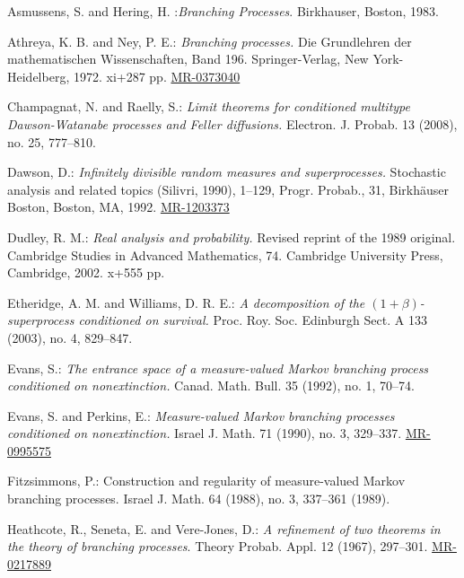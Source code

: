 \documentclass[12pt,a4paper]{amsart}
\numberwithin{equation}{section}
\theoremstyle{plain}
\theoremstyle{definition}
\theoremstyle{remark}
\def\MR#1{\href{http://www.ams.org/mathscinet-getitem?mr=#1}{MR-#1}}
\begin{document}
\begin{thebibliography}{99}

	Asmussens, S. and Hering, H. :\emph{Branching Processes}. Birkhauser, Boston, 1983.

	Athreya, K. B. and Ney, P. E.:
	\emph{Branching processes.}
	Die Grundlehren der mathematischen Wissenschaften, Band 196. Springer-Verlag, New York-Heidelberg, 1972. xi+287 pp.
	\MR{0373040}
	
Champagnat, N. and Raelly, S.:
	\emph{Limit theorems for conditioned multitype Dawson-Watanabe processes and Feller diffusions.}
	Electron. J. Probab. 13 (2008), no. 25,
	777--810.

	Dawson, D.:
	\emph{Infinitely divisible random measures and superprocesses.}
	Stochastic analysis and related topics (Silivri, 1990), 1--129, Progr. Probab., 31, Birkh\"auser Boston, Boston, MA, 1992.
	\MR{1203373}
	
	Dudley, R. M.:
	\emph{Real analysis and probability.}
	Revised reprint of the 1989 original. Cambridge Studies in Advanced Mathematics, 74. Cambridge University Press, Cambridge, 2002. x+555 pp.
	
Etheridge, A. M. and Williams, D. R. E.:
	\emph{A decomposition of the $(1+\beta)$-superprocess conditioned on survival.}
	Proc. Roy. Soc. Edinburgh Sect. A 133 (2003), no. 4,
	829--847.
	
	Evans, S.:
	\emph{The entrance space of a measure-valued Markov branching process conditioned on nonextinction.}
	Canad. Math. Bull. 35 (1992), no. 1,
	70--74.
	
Evans, S. and Perkins, E.:
	\emph{Measure-valued Markov branching processes conditioned on nonextinction.}
	Israel J. Math. 71 (1990), no. 3,
	329--337.
	\MR{0995575}
	
	Fitzsimmons, P.:
	Construction and regularity of measure-valued Markov branching processes.
	Israel J. Math. 64 (1988), no. 3, 337--361 (1989).

	Heathcote, R.,  Seneta, E.  and Vere-Jones, D.:
	\emph{A refinement of two theorems in the theory of branching processes}.
	Theory Probab. Appl. 12 (1967), 297--301.
	\MR{0217889}
	

\end{thebibliography}
\end{document}
